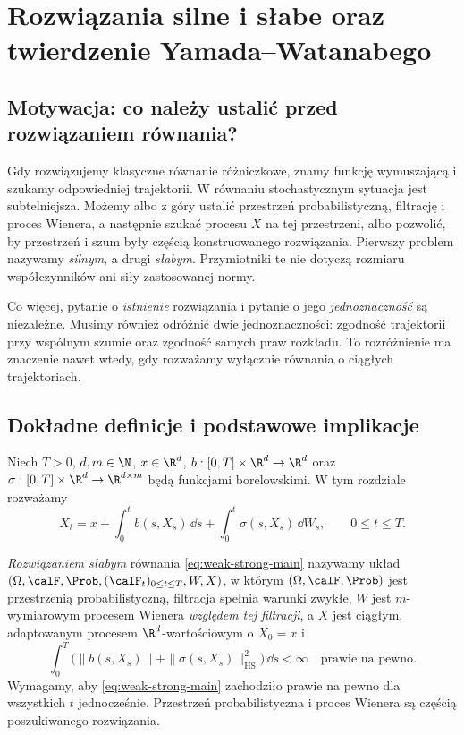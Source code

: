\chapter{Rozwiązania silne i słabe oraz twierdzenie Yamada--Watanabego}
\label{ch:weak-strong-sde}

\section{Motywacja: co należy ustalić przed rozwiązaniem równania?}

Gdy rozwiązujemy klasyczne równanie różniczkowe, znamy funkcję
wymuszającą i szukamy odpowiedniej trajektorii. W równaniu
stochastycznym sytuacja jest subtelniejsza. Możemy albo z góry
ustalić przestrzeń probabilistyczną, filtrację i proces Wienera,
a następnie szukać procesu $X$ na tej przestrzeni, albo
pozwolić, by przestrzeń i szum były częścią konstruowanego
rozwiązania. Pierwszy problem nazywamy \emph{silnym}, a drugi
\emph{słabym}. Przymiotniki te nie dotyczą rozmiaru współczynników
ani siły zastosowanej normy.

Co więcej, pytanie o \emph{istnienie} rozwiązania i pytanie
o jego \emph{jednoznaczność} są niezależne. Musimy również
odróżnić dwie jednoznaczności: zgodność trajektorii przy
wspólnym szumie oraz zgodność samych praw rozkładu. To
rozróżnienie ma znaczenie nawet wtedy, gdy rozważamy wyłącznie
równania o ciągłych trajektoriach.

\section{Dokładne definicje i podstawowe implikacje}

Niech $T>0$, $d,m\in\N$, $x\in\R^d$,
$b:[0,T]\times\R^d\to\R^d$ oraz
$\sigma:[0,T]\times\R^d\to\R^{d\times m}$ będą
funkcjami borelowskimi. W tym rozdziale rozważamy
\[
 X_t=x+\int_0^t b(s,X_s)\,\dd s
 +\int_0^t\sigma(s,X_s)\,\dd W_s,
 \qquad 0\le t\le T.
 \tag{14.1}\label{eq:weak-strong-main}
\]

\begin{definicja}
\label{def:weak-solution}
\emph{Rozwiązaniem słabym} równania \eqref{eq:weak-strong-main}
nazywamy układ
$(\Omega,\calF,\Prob,(\calF_t)_{0\le t\le T},W,X)$,
w którym $(\Omega,\calF,\Prob)$ jest przestrzenią
probabilistyczną, filtracja spełnia warunki zwykłe,
$W$ jest $m$-wymiarowym procesem Wienera \emph{względem tej
filtracji}, a $X$ jest ciągłym, adaptowanym procesem
$\R^d$-wartościowym o $X_0=x$ i
\[
 \int_0^T\bigl(\|b(s,X_s)\|+
 \|\sigma(s,X_s)\|_{\mathrm{HS}}^2\bigr)\,\dd s<\infty
 \quad\text{prawie na pewno}.
\]
Wymagamy, aby \eqref{eq:weak-strong-main} zachodziło
prawie na pewno dla wszystkich $t$ jednocześnie.
Przestrzeń probabilistyczna i proces Wienera są częścią
poszukiwanego rozwiązania.
\end{definicja}

